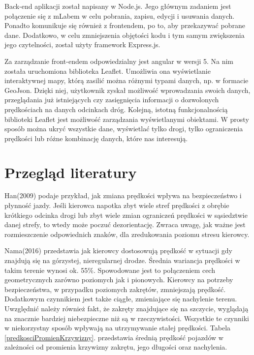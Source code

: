 	Back-end aplikacji został napisany w Node.js. Jego głównym zadaniem jest połączenie  się z mLabem w celu pobrania, zapisu, edycji i usuwania danych. Ponadto komunikuje się również z frontendem, po to, aby przekazywać pobrane dane.  Dodatkowo, w celu zmniejszenia objętości kodu i tym samym zwiększenia jego czytelności, został użyty framework Express.js.

	Za zarządzanie front-endem odpowiedzialny jest angular w wersji 5. Na nim została uruchomiona biblioteka Leaflet. Umożliwia ona wyświetlanie interaktywnej mapy, którą zasilić można różnymi typami danych, np. w formacie GeoJson. Dzięki niej, użytkownik zyskał możliwość wprowadzania swoich danych, przeglądania już istniejących czy zasięgnięcia informacji o dozwolonych prędkościach na danych odcinkach dróg. Kolejną,  istotną funkcjonalnością biblioteki Leaflet jest możliwość zarządzania wyświetlanymi obiektami. W prosty sposób można ukryć wszystkie dane, wyświetlać tylko drogi, tylko ograniczenia prędkości lub różne kombinację danych, które nas interesują.

\section{Przegląd literatury}
\label{sec:przegladLiteratury}

Han(2009) podaje przykład, jak zmiana prędkości wpływa na bezpieczeństwo i płynność jazdy. Jeśli kierowca napotka zbyt wiele stref prędkości z obrębie krótkiego odcinka drogi lub zbyt wiele zmian ograniczeń prędkości w sąsiedztwie danej strefy, to wtedy może poczuć dezorientację. Zwraca uwagę, jak ważne jest rozmieszczenie odpowiednich znaków, dla zredukowania poziomu stresu kierowcy.

Nama(2016) przedstawia jak kierowcy dostosowują prędkość w sytuacji gdy znajdują się na górzystej, nieregularnej drodze. Średnia wariancja prędkości w takim terenie wynosi ok. 55\%. Spowodowane jest to połączeniem cech geometrycznych zarówno poziomych jak i pionowych. Kierowcy na potrzeby bezpieczeństwa, w przypadku poziomych zakrętów, zmniejszają prędkość. Dodatkowym czynnikiem jest także ciągłe, zmieniające się nachylenie terenu. Uwzględnić należy również fakt, że zakręty znajdujące się na szczycie, wyglądają na znacznie bardziej niebezpieczne niż są w rzeczywistości. Wszystkie te czynniki w niekorzystny sposób wpływają na utrzymywanie stałej prędkości. Tabela \ref{predkosciPromienKrzywizny}. przedstawia średnią prędkość pojazdów w zależności od promienia krzywizny zakrętu, jego długości oraz nachylenia.


